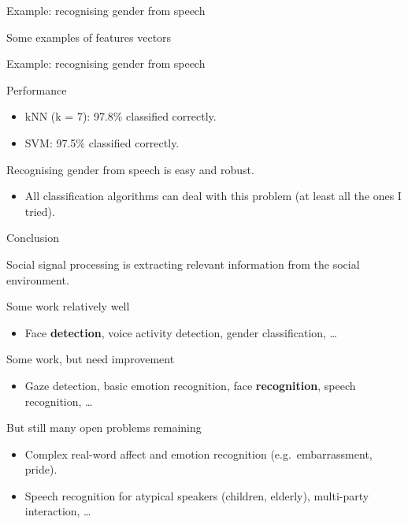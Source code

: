 \documentclass[compress]{beamer}
\begin{document}
\begin{frame}{Example: recognising gender from speech}

\begin{block}{Some examples of features vectors}

\end{block}

\end{frame}

\begin{frame}{Example: recognising gender from speech}

Performance

\begin{itemize}

\item
  kNN (k = 7): 97.8\% classified correctly.
\item
  SVM: 97.5\% classified correctly.
\end{itemize}

Recognising gender from speech is easy and robust.

\begin{itemize}

\item
  All classification algorithms can deal with this problem (at least all
  the ones I tried).
\end{itemize}

\end{frame}

\begin{frame}{Conclusion}

Social signal processing is extracting relevant information from the
social environment.

Some work relatively well

\begin{itemize}

\item
  Face \textbf{detection}, voice activity detection, gender
  classification, \ldots{}
\end{itemize}

Some work, but need improvement

\begin{itemize}

\item
  Gaze detection, basic emotion recognition, face \textbf{recognition},
  speech recognition, \ldots{}
\end{itemize}

But still many open problems remaining

\begin{itemize}

\item
  Complex real-word affect and emotion recognition (e.g.~embarrassment,
  pride).
\item
  Speech recognition for atypical speakers (children, elderly),
  multi-party interaction, \ldots{}
\end{itemize}

\end{frame}
\end{document}
